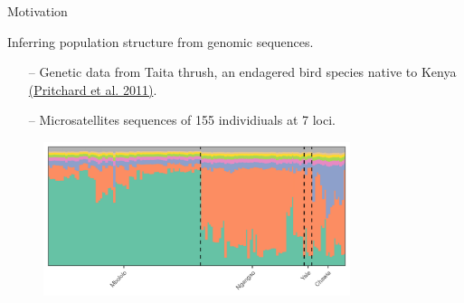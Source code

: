 
\begin{frame}{Motivation}

Inferring population structure from genomic sequences.
\begin{itemize}
  \item[--] Genetic data from Taita thrush, an endagered bird species native to Kenya
  {\color{blue} \href{https://web.stanford.edu/group/pritchardlab/publications/pdfs/PritchardEtAl00.pdf}{(Pritchard et al. 2011)}}.

  \item[--] Microsatellites sequences of 155 individiuals at 7 loci.
\end{itemize}


\begin{figure}[!h]
\centering
\includegraphics[width = 0.8\textwidth]{./figures/structure_example.png}
\end{figure}

\end{frame}


